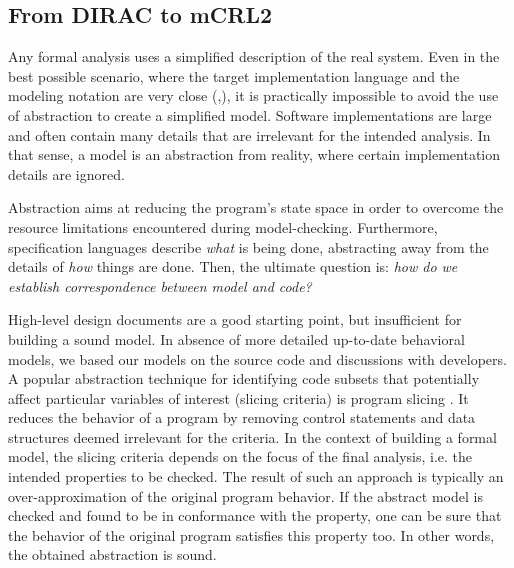 \documentclass[sort&compress,preprint,3p]{elsarticle}
\begin{document}
\subsection{From DIRAC to mCRL2}

Any formal analysis uses a simplified description of the real system. Even in the 
best possible scenario, where the target implementation language and the modeling 
notation are very close (\cite{Java_PathFinder},\cite{Musuvathi04modelchecking}), 
it is practically impossible to avoid the use of abstraction to create a simplified model. 
Software implementations are large and often contain many details that are irrelevant 
for the intended analysis. In that sense, a model is an abstraction from reality,
where certain implementation details are ignored.

Abstraction aims at reducing
the program's state space in order to overcome the resource limitations \cite{Pelánek08fightingstate} encountered during model-checking. 
Furthermore, specification languages describe \textit{what} is being done, 
abstracting away from the details of \textit{how} things are done. 
Then, the ultimate question is: \textit{how do we establish correspondence between model and code?}

High-level design documents are a good starting point, but insufficient for 
building a sound model.
In absence of more detailed up-to-date behavioral models, 
we based our models on the source code and discussions with developers.
A popular abstraction technique
for identifying code subsets that potentially affect particular 
variables of interest (slicing criteria) is program slicing \cite{Hatcliff99slicingsoftware}. 
It reduces the behavior of a program
by removing control statements and data structures deemed irrelevant for 
the criteria. In the context of building a formal model, the slicing criteria 
depends on the focus of the final analysis, i.e. the intended properties to be checked.
The result of such an approach is typically an over-approximation of the original program behavior.
If the abstract model is checked and found to be in conformance with the property,
one can be sure that the behavior of the original program satisfies this property too. 
In other words, the obtained abstraction is sound.
\end{document}
